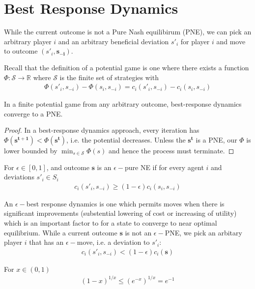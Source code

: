 
\section{Best Response Dynamics}
While the current outcome is not a Pure Nash equilibirum (PNE), we can pick an arbitrary player $i$ and an arbitrary beneficial deviation $s'_i$ for player $i$ and move to outcome $(s'_i,\mathbf{s_{-i}})$.

Recall that the definition of a potential game is one where there exists a function $\Phi:\mathcal{S}\to \mathbb{R}$ where $\mathcal{S}$ is the finite set of strategies with
\begin{align*}
\Phi(s'_i,s_{-i})-\Phi(s_i,s_{-i})=c_i(s'_i,s_{-i})-c_i(s_i,s_{-i})
\end{align*}

\begin{prop}
In a finite potential game from any arbitrary outcome, best-response dynamics converge to a PNE.
\begin{proof}
In a best-response dynamics approach, every iteration has $\Phi(\mathbf{s^{t+1}})<\Phi(\mathbf{s^t})$, i.e. the potential decreases. Unless the $\mathbf{s^t}$ is a PNE, our $\Phi$ is lower bounded by $\min_{s\in \mathcal{S}}\Phi(s)$ and hence the process must terminate.
\end{proof}
\end{prop}

\begin{defn}
For $\epsilon \in [0,1]$, and outcome $\mathbf{s}$ is an $\epsilon-$pure NE if for every agent $i$ and deviations $s'_i\in S_i$
\begin{align*}
c_i(s'_i,s_{-i})\geq (1-\epsilon)c_i(s_i,s_{-i})
\end{align*}
\end{defn}

An $\epsilon-$best response dynamics is one which permits moves when there is significant improvements (substential lowering of cost or increasing of utility) which is an important factor to for a state to converge to near optimal equilibrium. While a current outcome $\mathbf{s}$ is not an $\epsilon-$PNE, we pick an arbitary player $i$ that has an $\epsilon-$move, i.e. a deviation to $s'_i$:
\begin{align*}
c_i(s'_i,s_{-i})<(1-\epsilon)c_i(\mathbf{s})
\end{align*}


\begin{lemma}
For $x\in (0,1)$
\begin{align*}
(1-x)^{1/x}\leq (e^{-x})^{1/x}=e^{-1}
\end{align*}
\label{lemma:exp}
\end{lemma}


